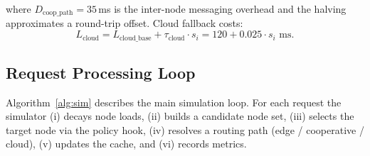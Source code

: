 \documentclass[12pt]{article}
\begin{document}
where $D_{\text{coop\_path}} = 35$\,ms is the inter-node messaging overhead and the halving approximates a round-trip offset. Cloud fallback costs:
\begin{equation}
  L_{\text{cloud}} = L_{\text{cloud\_base}} + \tau_{\text{cloud}} \cdot s_i = 120 + 0.025 \cdot s_i \text{ ms}.
\end{equation}

\subsection{Request Processing Loop}

Algorithm~\ref{alg:sim} describes the main simulation loop. For each request the simulator (i) decays node loads, (ii) builds a candidate node set, (iii) selects the target node via the policy hook, (iv) resolves a routing path (edge / cooperative / cloud), (v) updates the cache, and (vi) records metrics.
\end{document}
